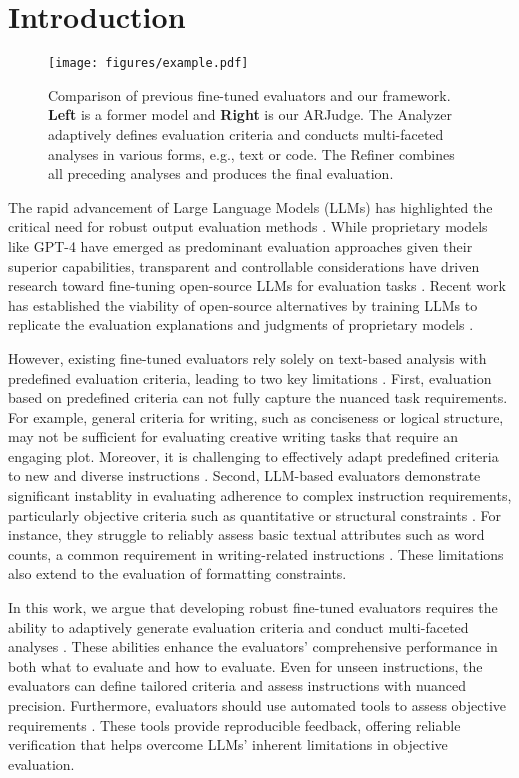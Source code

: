 \section{Introduction}
\begin{figure}[t!]
	\centering
	\texttt{[image: figures/example.pdf]}
	\caption{Comparison of previous fine-tuned evaluators and our framework. \textbf{Left} is a former model and \textbf{Right} is our ARJudge. The Analyzer adaptively defines evaluation criteria and conducts multi-faceted analyses in various forms, e.g., text or code. The Refiner combines all preceding analyses and produces the final evaluation.}
	\label{intro_example}
\end{figure}

The rapid advancement of Large Language Models (LLMs) has highlighted the critical need for robust output evaluation methods \cite{survey_judge}. While proprietary models like GPT-4 have emerged as predominant evaluation approaches given their superior capabilities, transparent and controllable considerations have driven research toward fine-tuning open-source LLMs for evaluation tasks \cite{prometheus, prometheus2}. Recent work has established the viability of open-source alternatives by training LLMs to replicate the evaluation explanations and judgments of proprietary models \cite{critiqueLLM, x-eval, themis, prometheus2}.

However, existing fine-tuned evaluators rely solely on text-based analysis with predefined  evaluation criteria, leading to two key limitations \cite{auto-j, themis, judgelm, prometheus2}. 
First, evaluation based on predefined criteria can not fully capture the nuanced task requirements. %
For example, general criteria for writing, such as conciseness or logical structure, may not be sufficient for evaluating creative writing tasks that require an engaging plot. Moreover, it is challenging to effectively adapt predefined criteria to new and diverse instructions \cite{auto-j}. 
Second, LLM-based evaluators demonstrate significant instablity in evaluating adherence to complex instruction requirements, particularly objective criteria such as quantitative or structural constraints \cite{ifeval}. For instance,  they struggle to reliably assess basic textual attributes such as word counts, a common requirement in writing-related instructions \cite{llm_bad_word_level}. These limitations also extend to the evaluation of formatting constraints. 

In this work, we argue that developing robust fine-tuned evaluators requires the ability to adaptively generate evaluation criteria and conduct multi-faceted analyses \cite{branch-merge}. These abilities enhance the evaluators' comprehensive performance in both what to evaluate and how to evaluate. Even for unseen instructions, the evaluators can define tailored criteria and assess instructions with nuanced precision.   
Furthermore, evaluators should use automated tools to assess objective requirements \cite{mint}. These tools provide reproducible feedback, offering reliable verification that helps overcome LLMs' inherent limitations in objective evaluation. 

